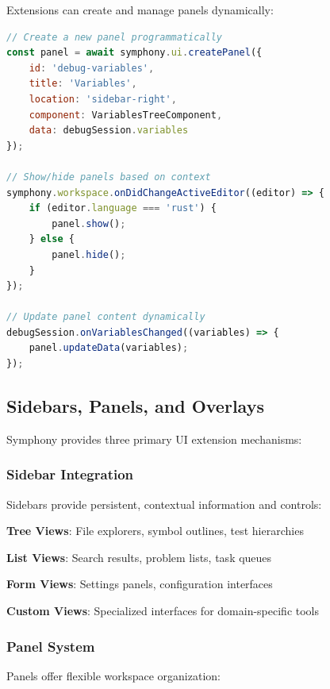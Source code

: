 Extensions can create and manage panels dynamically:

\begin{lstlisting}[language=JavaScript, caption=Dynamic Panel Creation]
// Create a new panel programmatically
const panel = await symphony.ui.createPanel({
    id: 'debug-variables',
    title: 'Variables',
    location: 'sidebar-right',
    component: VariablesTreeComponent,
    data: debugSession.variables
});

// Show/hide panels based on context
symphony.workspace.onDidChangeActiveEditor((editor) => {
    if (editor.language === 'rust') {
        panel.show();
    } else {
        panel.hide();
    }
});

// Update panel content dynamically
debugSession.onVariablesChanged((variables) => {
    panel.updateData(variables);
});
\end{lstlisting}

\subsection*{Sidebars, Panels, and Overlays}

Symphony provides three primary UI extension mechanisms:

\subsubsection*{Sidebar Integration}

Sidebars provide persistent, contextual information and controls:

\begin{compactlist}
    \item \textbf{Tree Views}: File explorers, symbol outlines, test hierarchies
    \item \textbf{List Views}: Search results, problem lists, task queues
    \item \textbf{Form Views}: Settings panels, configuration interfaces
    \item \textbf{Custom Views}: Specialized interfaces for domain-specific tools
\end{compactlist}

\subsubsection*{Panel System}

Panels offer flexible workspace organization:

